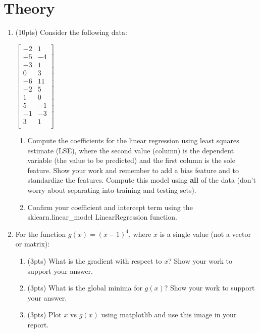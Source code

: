 \documentclass[12pt]{article}
\begin{document}
\section{Theory}
\begin{enumerate}
\item   (10pts) Consider the following data:\\
\begin{center}
$
 \begin{bmatrix}
	-2 & 1\\
	-5 & -4\\	
	-3 & 1\\
	0 & 3\\
	-6 & 11\\
	-2 & 5\\
	1 & 0\\
	5 & -1\\
	-1 & -3\\
	3 & 1\\
\end{bmatrix}
$
\end{center}
	\begin{enumerate}
	\item Compute the coefficients for the linear regression using least squares estimate (LSE), where the second value (column) is the dependent variable (the value to be predicted) and the first column is the sole feature.  Show your work and remember to add a bias feature and to standardize the features.  Compute this model using \textbf{all} of the data (don't worry about separating into training and testing sets).\\
	\item Confirm your coefficient and intercept term using the sklearn.linear\_model LinearRegression function.  
	\end{enumerate}
	
\item For the function $g(x)=(x-1)^4$, where $x$ is a single value (not a vector or matrix):
\begin{enumerate}
\item (3pts) What is the gradient with respect to $x$?  Show your work to support your answer.
\item (3pts) What is the global minima for $g(x)$?  Show your work to support your answer.
\item (3pts) Plot $x$ vs $g(x)$ using matplotlib and use this image in your report.
\end{enumerate}

\end{enumerate}
\end{document}
